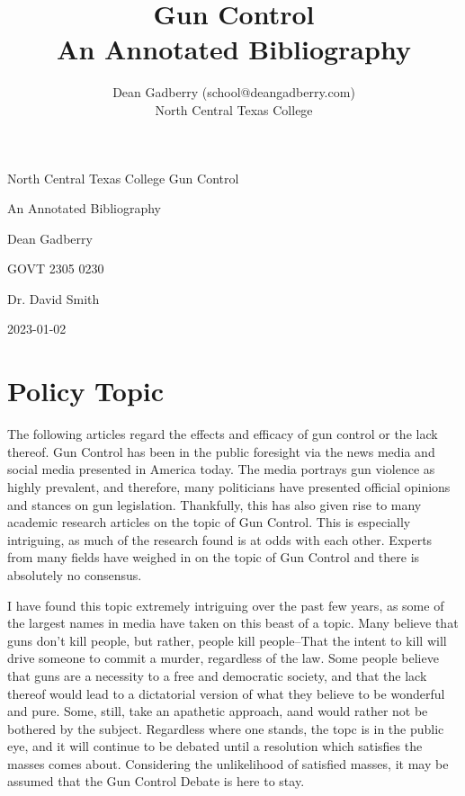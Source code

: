 \documentclass [12pt]{article}
\title{Gun Control\\\medskip An Annotated Bibliography}
\author{Dean Gadberry (school@deangadberry.com)\\North Central Texas College}
\begin{document}
\begin{titlepage}
\centering
    North Central Texas College 
\vfill
    Gun Control \par
    An Annotated Bibliography \par
\vfill
\parbox{.5\textwidth}
    {\centering 
        Dean Gadberry \par
        GOVT 2305 0230\par
        Dr. David Smith \par
        2023-01-02
    }
\end{titlepage}
\pagebreak

\section{Policy Topic}
The following articles regard the effects and efficacy of gun control or the lack thereof. Gun Control has been in the public foresight via the news media and social media presented in America today. The media portrays gun violence as highly prevalent, and therefore, many politicians have presented official opinions and stances on gun legislation. Thankfully, this has also given rise to many academic research articles on the topic of Gun Control. This is especially intriguing, as much of the research found is at odds with each other. Experts from many fields have weighed in on the topic of Gun Control and there is absolutely no consensus. \par I have found this topic extremely intriguing over the past few years, as some of the largest names in media have taken on this beast of a topic. Many believe that guns don't kill people, but rather, people kill people--That the intent to kill will drive someone to commit a murder, regardless of the law. Some people believe that guns are a necessity to a free and democratic society, and that the lack thereof would lead to a dictatorial version of what they believe to be wonderful and pure. Some, still, take an apathetic approach, aand would rather not be bothered by the subject. Regardless where one stands, the topc is in the public eye, and it will continue to be debated until a resolution which satisfies the masses comes about. Considering the unlikelihood of satisfied masses, it may be assumed that the Gun Control Debate is here to stay. 
\pagebreak
\end{document}

